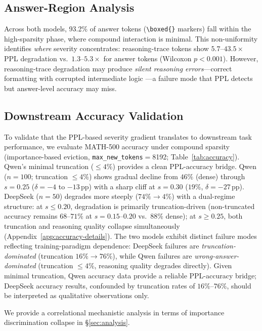\subsection{Answer-Region Analysis}
\label{sec:answer-region}

Across both models, 93.2\% of answer tokens (\verb|\boxed{}| markers) fall within the high-sparsity phase, where compound interaction is minimal. This non-uniformity identifies \emph{where} severity concentrates: reasoning-trace tokens show $5.7$--$43.5{\times}$ PPL degradation vs.\ $1.3$--$5.3{\times}$ for answer tokens (Wilcoxon $p < 0.001$). However, reasoning-trace degradation may produce \emph{silent reasoning errors}---correct formatting with corrupted intermediate logic \cite{lanham-2023-faithfulness, turpin-2023-biased-cot}---a failure mode that PPL detects but answer-level accuracy may miss.

\subsection{Downstream Accuracy Validation}
\label{sec:accuracy-validation}

To validate that the PPL-based severity gradient translates to downstream task performance, we evaluate MATH-500 accuracy under compound sparsity (importance-based eviction, \texttt{max\_new\_tokens}${=}$8192; Table~\ref{tab:accuracy}). Qwen's minimal truncation ($\leq 4\%$) provides a clean PPL-accuracy bridge.
Qwen ($n{=}100$; truncation $\leq 4\%$) shows gradual decline from $46\%$ (dense) through $s{=}0.25$ ($\delta{=}-4$ to $-13$\,pp) with a sharp cliff at $s{=}0.30$ ($19\%$, $\delta{=}-27$\,pp). DeepSeek ($n{=}50$) degrades more steeply ($74\% \to 4\%$) with a dual-regime structure: at $s \leq 0.20$, degradation is primarily truncation-driven (non-truncated accuracy remains $68$--$71\%$ at $s{=}0.15$--$0.20$ vs.\ $88\%$ dense); at $s \geq 0.25$, both truncation and reasoning quality collapse simultaneously (Appendix~\ref{app:accuracy-details}).
The two models exhibit distinct failure modes reflecting training-paradigm dependence: DeepSeek failures are \emph{truncation-dominated} (truncation $16\% \to 76\%$), while Qwen failures are \emph{wrong-answer-dominated} (truncation $\leq 4\%$, reasoning quality degrades directly). Given minimal truncation, Qwen accuracy data provide a reliable PPL-accuracy bridge; DeepSeek accuracy results, confounded by truncation rates of $16\%$--$76\%$, should be interpreted as qualitative observations only.

We provide a correlational mechanistic analysis in terms of importance discrimination collapse in \S\ref{sec:analysis}.
